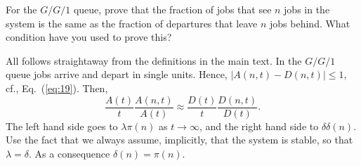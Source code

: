 \begin{exercise}
  For the $G/G/1$ queue, prove that the fraction of jobs that see $n$
  jobs in the system is the same as the fraction of departures that
  leave $n$ jobs behind. What condition have you used to prove this?
  \begin{solution}
    All follows straightaway from the definitions in the main text. In
    the $G/G/1$ queue jobs arrive and depart in single units. Hence,
    $|A(n,t)-D(n,t)|\leq 1$, cf., Eq.~(\ref{eq:19}). Then, 
    \begin{equation*}
      \frac{A(t)}{t}\frac{A(n,t)}{A(t)} \approx 
      \frac{D(t)}{t}\frac{D(n,t)}{D(t)}. 
    \end{equation*}
    The left hand side goes to $\lambda \pi(n)$ as $t\to\infty$, and
    the right hand side to $\delta \delta(n)$. Use the fact that we
    always assume, implicitly, that the system is stable, so that
    $\lambda = \delta$. As a consequence $\delta(n) = \pi(n)$.
  \end{solution}
\end{exercise}

